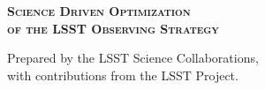 \documentclass[11pt,headsepline,cleardoubleempty,twoside,openright]{scrbook}
\begin{document}
\begin{titlepage}
\begin{center}


{\Huge\bfseries\scshape
 Science Driven Optimization \\ \vspace{\baselineskip}
 of the LSST Observing Strategy}



% 

%
%


{\Large  Prepared by the LSST Science Collaborations,}\\
{\Large with contributions from the LSST Project. }\\

\end{center}
\end{titlepage}


\tableofcontents
\label{toc}

\clearemptydoublepage












\end{document}
